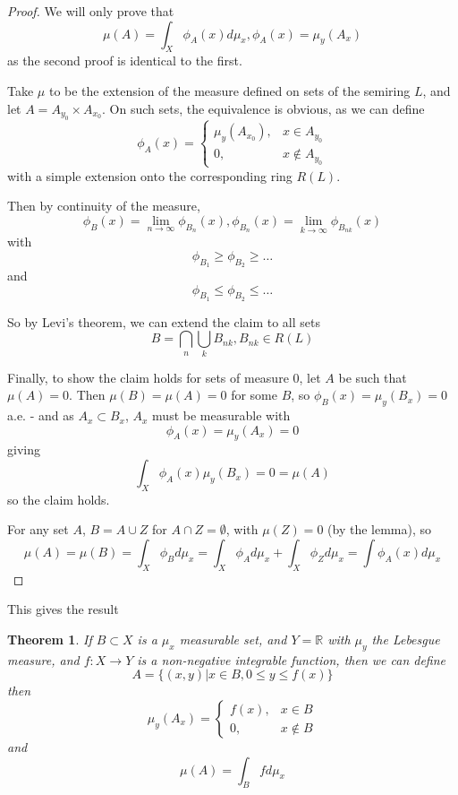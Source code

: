 \documentclass[11pt,a4paper]{report}
\theoremstyle{plain}
\newtheorem{thm}{Theorem}[section]
\theoremstyle{definition}
\theoremstyle{remark}
\newcommand{\union}{\cup}
\newcommand{\intersection}{\cap}
\newcommand{\Union}{\bigcup}
\newcommand{\Intersection}{\bigcap}
\newcommand{\R}{\mathbb{R}}
\begin{document}
\begin{proof}
  We will only prove that
  $$ \mu(A) = \int_X \phi_A(x) d\mu_x, \phi_A(x) = \mu_y(A_x) $$
  as the second proof is identical to the first.

  Take $\mu$ to be the extension of the measure defined on sets of the semiring $L$, and let $A = A_{y_0} \times A_{x_0}$. On such sets, the equivalence is obvious, as we can define
    $$ \phi_A(x) = \begin{cases}
        \mu_y(A_{x_0}), & x \in A_{y_0} \\ 
        0, & x \not \in A_{y_0}
      \end{cases} $$
  with a simple extension onto the corresponding ring $R(L)$.

    Then by continuity of the measure, 
    $$\phi_B(x) = \lim_{n \rightarrow \infty} \phi_{B_n}(x), \phi_{B_n}(x) = \lim_{k \rightarrow \infty} \phi_{B_{nk}}(x)$$
    with
    $$ \phi_{B_1} \ge \phi_{B_2} \ge \dots $$
    and
    $$ \phi_{B_1} \le \phi_{B_2} \le \dots $$

    So by Levi's theorem, we can extend the claim to all sets
    $$ B = \Intersection_n \Union_k B_{nk}, B_{nk} \in R(L) $$

    Finally, to show the claim holds for sets of measure 0, let $A$ be such that $\mu(A) = 0$. Then $\mu(B) = \mu(A) = 0$ for some $B$, so $ \phi_B(x) = \mu_y(B_x) = 0 $ a.e. - and as $A_x \subset B_x$, $A_x$ must be measurable with
    $$ \phi_A(x) = \mu_y(A_x) = 0 $$
    giving
    $$ \int_X \phi_A(x)\mu_y(B_x) = 0 = \mu(A) $$
    so the claim holds.

    For any set $A$, $B = A \union Z$ for $A \intersection Z = \emptyset$, with $\mu(Z) = 0$ (by the lemma), so
    $$ \mu(A) = \mu(B) = \int_X \phi_B d\mu_x  = \int_X \phi_A d\mu_x + \int_X \phi_Z d \mu_x = \int \phi_A(x) d\mu_x $$
\end{proof}


This gives the result
\begin{thm}\label{measure_of_graph_is_integral}
    If $B \subset X$ is a $\mu_x$ measurable set, and $Y = \R$ with $\mu_y$ the Lebesgue measure, and $f : X \to Y$ is a non-negative integrable function, then we can define
    $$ A = \{ (x, y) | x \in B, 0 \le y \le f(x) \} $$
    then
    $$ \mu_y(A_x) = \begin{cases} 
      f(x), &x \in B \\
      0, &x \not \in B
    \end{cases} $$
    and
    $$ \mu(A) = \int_B f d \mu_x $$
\end{thm}
\end{document}
